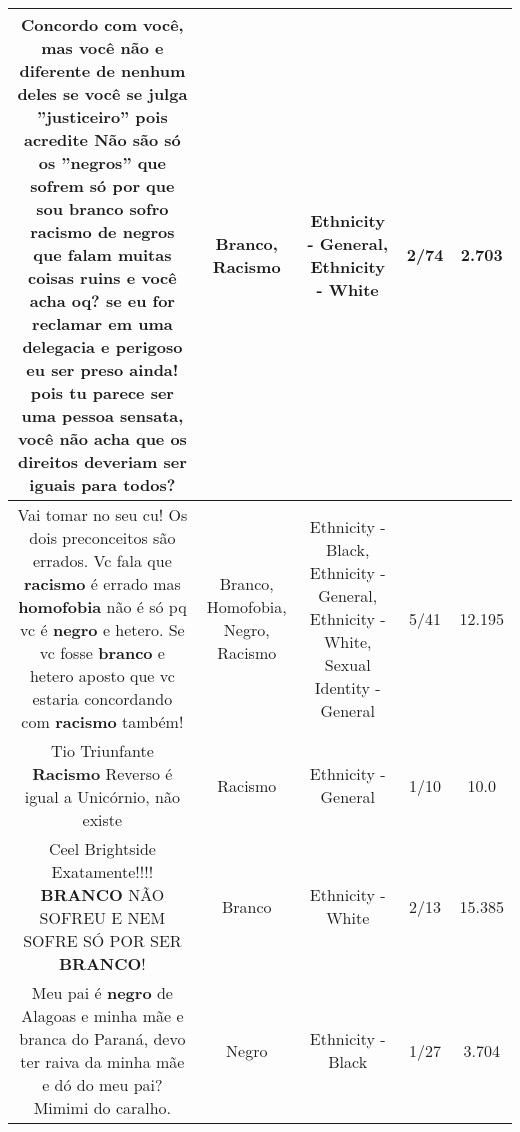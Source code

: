 \documentclass[11pt]{article}
\newlength\mylength
\begin{document}
\begin{center}
\begin{longtable}{|C{.65\mylength}|C{.30\mylength}|C{.12\mylength}|C{.12\mylength}|C{.12\mylength}|}
  \small Concordo com você, mas você não e diferente de nenhum deles se você se julga ''justiceiro'' pois acredite Não são só os ''negros'' que sofrem só por que sou \textbf{branco} sofro \textbf{racismo} de negros que falam muitas coisas ruins e você acha oq? se eu for reclamar em uma delegacia e perigoso eu ser preso ainda! pois tu parece ser uma pessoa sensata, você não acha que os direitos deveriam ser iguais para todos?\normalsize   & Branco, Racismo & Ethnicity - General, Ethnicity - White & 2/74 & 2.703 \\  \hline
  \small Vai tomar no seu cu! Os dois preconceitos são errados. Vc fala que \textbf{racismo} é errado mas \textbf{homofobia} não é só pq vc é \textbf{negro} e hetero. Se vc fosse \textbf{branco} e hetero aposto que vc estaria concordando com \textbf{racismo} também!\normalsize   & Branco, Homofobia, Negro, Racismo & Ethnicity - Black, Ethnicity - General, Ethnicity - White, Sexual Identity - General & 5/41 & 12.195 \\  \hline
  \small Tio Triunfante \textbf{Racismo} Reverso é igual a Unicórnio, não existe\normalsize   & Racismo & Ethnicity - General & 1/10 & 10.0 \\  \hline
  \small Ceel Brightside Exatamente!!!! \textbf{BRANCO} NÃO SOFREU E NEM SOFRE SÓ POR SER \textbf{BRANCO}!\normalsize   & Branco & Ethnicity - White & 2/13 & 15.385 \\  \hline
  \small Meu pai é \textbf{negro} de Alagoas e minha mãe e branca do Paraná, devo ter raiva da minha mãe e dó do meu pai?Mimimi do caralho.\normalsize   & Negro & Ethnicity - Black & 1/27 & 3.704 \\  \hline

\end{longtable}
\end{center}
\end{document}
